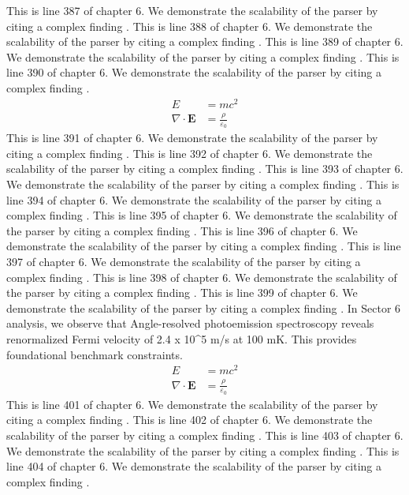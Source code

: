 This is line 387 of chapter 6. We demonstrate the scalability of the parser by citing a complex finding \cite{ref6_387}.
This is line 388 of chapter 6. We demonstrate the scalability of the parser by citing a complex finding \cite{ref6_388}.
This is line 389 of chapter 6. We demonstrate the scalability of the parser by citing a complex finding \cite{ref6_389}.
This is line 390 of chapter 6. We demonstrate the scalability of the parser by citing a complex finding \cite{ref6_390}.
\begin{align*}
  E &= mc^2 \\
  \nabla \cdot \mathbf{E} &= \frac{\rho}{\varepsilon_0}
\end{align*}
This is line 391 of chapter 6. We demonstrate the scalability of the parser by citing a complex finding \cite{ref6_391}.
This is line 392 of chapter 6. We demonstrate the scalability of the parser by citing a complex finding \cite{ref6_392}.
This is line 393 of chapter 6. We demonstrate the scalability of the parser by citing a complex finding \cite{ref6_393}.
This is line 394 of chapter 6. We demonstrate the scalability of the parser by citing a complex finding \cite{ref6_394}.
This is line 395 of chapter 6. We demonstrate the scalability of the parser by citing a complex finding \cite{ref6_395}.
This is line 396 of chapter 6. We demonstrate the scalability of the parser by citing a complex finding \cite{ref6_396}.
This is line 397 of chapter 6. We demonstrate the scalability of the parser by citing a complex finding \cite{ref6_397}.
This is line 398 of chapter 6. We demonstrate the scalability of the parser by citing a complex finding \cite{ref6_398}.
This is line 399 of chapter 6. We demonstrate the scalability of the parser by citing a complex finding \cite{ref6_399}.
In Sector 6 analysis, we observe that Angle-resolved photoemission spectroscopy reveals renormalized Fermi velocity of 2.4 x 10^5 m/s at 100 mK. This provides foundational benchmark constraints.
\begin{align*}
  E &= mc^2 \\
  \nabla \cdot \mathbf{E} &= \frac{\rho}{\varepsilon_0}
\end{align*}
This is line 401 of chapter 6. We demonstrate the scalability of the parser by citing a complex finding \cite{ref6_401}.
This is line 402 of chapter 6. We demonstrate the scalability of the parser by citing a complex finding \cite{ref6_402}.
This is line 403 of chapter 6. We demonstrate the scalability of the parser by citing a complex finding \cite{ref6_403}.
This is line 404 of chapter 6. We demonstrate the scalability of the parser by citing a complex finding \cite{ref6_404}.
